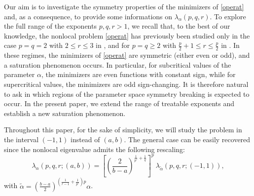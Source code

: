 \documentclass{amsart}
\theoremstyle{definition}
\theoremstyle{remark}
\begin{document}
Our aim is to investigate the symmetry properties of the minimizers of \eqref{operat} and, as a consequence, to provide some informations on $\lambda_\alpha(p,q,r)$. To explore the full range of the exponents $p,q,r>1$, we recall that, to the best of our knowledge, the nonlocal problem \eqref{operat} has previously been studied only in the case $p=q=2$ with $2\leq r\leq 3$ in \cite{DP}, and for $p=q\ge2$ with $\frac p2+1\leq r\leq \frac p2$ in \cite{DP2}. In these regimes, the minimizers of \eqref{operat} are symmetric (either even or odd), and a saturation phenomenon occurs. In particular, for subcritical values of the parameter $\alpha$, the minimizers are even functions with constant sign, while for supercritical values, the minimizers are odd sign-changing. It is therefore natural to ask in which regions of the parameter space symmetry breaking is expected to occur.
In the present paper, we extend the range of treatable exponents and establish a new saturation phenomenon.

Throughout this paper, for the sake of simplicity, we will study the problem in the interval $(-1,1)$ instead of $(a,b)$. The general case can be easily recovered since the nonlocal eigenvalue admits the following rescaling:
\[
\lambda_{\alpha}(p,q,r;(a,b))=\left[ \left(\frac{2}{b-a}\right)^{\frac1{p'}+\frac 1q} \right]^p\ 
\lambda_{\tilde \alpha}\left(p,q,r;(-1,1)\right),
\]
with $\tilde \alpha=\left(\frac{b-a}{2}\right)^{\left(\frac 1{r-1}+\frac 1{p'}\right)p}\alpha$.
\end{document}
